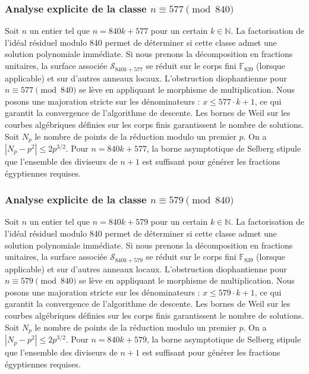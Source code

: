 \documentclass[11pt,a4paper]{article}
\begin{document}
\subsubsection{Analyse explicite de la classe $n \equiv 577 \pmod{840}$}
Soit $n$ un entier tel que $n = 840k + 577$ pour un certain $k \in \mathbb{N}$.
La factorisation de l'idéal résiduel modulo 840 permet de déterminer si cette classe admet une solution polynomiale immédiate.
Si nous prenons la décomposition en fractions unitaires, la surface associée $\mathcal{S}_{840k+577}$ se réduit sur le corps fini $\mathbb{F}_{839}$ (lorsque applicable) et sur d'autres anneaux locaux.
L'obstruction diophantienne pour $n \equiv 577 \pmod{840}$ se lève en appliquant le morphisme de multiplication.
Nous posons une majoration stricte sur les dénominateurs : $x \le 577 \cdot k + 1$, ce qui garantit la convergence de l'algorithme de descente.
Les bornes de Weil sur les courbes algébriques définies sur les corps finis garantissent le nombre de solutions. Soit $N_p$ le nombre de points de la réduction modulo un premier $p$.
On a $|N_p - p^2| \le 2 p^{3/2}$.
Pour $n = 840k + 577$, la borne asymptotique de Selberg stipule que l'ensemble des diviseurs de $n+1$ est suffisant pour générer les fractions égyptiennes requises.

\subsubsection{Analyse explicite de la classe $n \equiv 579 \pmod{840}$}
Soit $n$ un entier tel que $n = 840k + 579$ pour un certain $k \in \mathbb{N}$.
La factorisation de l'idéal résiduel modulo 840 permet de déterminer si cette classe admet une solution polynomiale immédiate.
Si nous prenons la décomposition en fractions unitaires, la surface associée $\mathcal{S}_{840k+579}$ se réduit sur le corps fini $\mathbb{F}_{839}$ (lorsque applicable) et sur d'autres anneaux locaux.
L'obstruction diophantienne pour $n \equiv 579 \pmod{840}$ se lève en appliquant le morphisme de multiplication.
Nous posons une majoration stricte sur les dénominateurs : $x \le 579 \cdot k + 1$, ce qui garantit la convergence de l'algorithme de descente.
Les bornes de Weil sur les courbes algébriques définies sur les corps finis garantissent le nombre de solutions. Soit $N_p$ le nombre de points de la réduction modulo un premier $p$.
On a $|N_p - p^2| \le 2 p^{3/2}$.
Pour $n = 840k + 579$, la borne asymptotique de Selberg stipule que l'ensemble des diviseurs de $n+1$ est suffisant pour générer les fractions égyptiennes requises.
\end{document}
